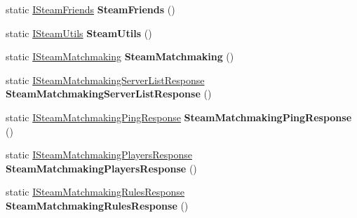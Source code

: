 \begin{DoxyCompactItemize}
\item 
\hypertarget{classValve_1_1Steamworks_1_1SteamAPI_a60561d4e0eeb5df7292e3ef841ff7df7}{}static \hyperlink{classValve_1_1Steamworks_1_1ISteamFriends}{I\+Steam\+Friends} {\bfseries Steam\+Friends} ()\label{classValve_1_1Steamworks_1_1SteamAPI_a60561d4e0eeb5df7292e3ef841ff7df7}

\item 
\hypertarget{classValve_1_1Steamworks_1_1SteamAPI_a92f204ee8c970c5f026b04f074943b4b}{}static \hyperlink{classValve_1_1Steamworks_1_1ISteamUtils}{I\+Steam\+Utils} {\bfseries Steam\+Utils} ()\label{classValve_1_1Steamworks_1_1SteamAPI_a92f204ee8c970c5f026b04f074943b4b}

\item 
\hypertarget{classValve_1_1Steamworks_1_1SteamAPI_a9ce4b71a247d6a4ed67331948f518b53}{}static \hyperlink{classValve_1_1Steamworks_1_1ISteamMatchmaking}{I\+Steam\+Matchmaking} {\bfseries Steam\+Matchmaking} ()\label{classValve_1_1Steamworks_1_1SteamAPI_a9ce4b71a247d6a4ed67331948f518b53}

\item 
\hypertarget{classValve_1_1Steamworks_1_1SteamAPI_a2442f7505c4ea8e32ced61bb82e41249}{}static \hyperlink{classValve_1_1Steamworks_1_1ISteamMatchmakingServerListResponse}{I\+Steam\+Matchmaking\+Server\+List\+Response} {\bfseries Steam\+Matchmaking\+Server\+List\+Response} ()\label{classValve_1_1Steamworks_1_1SteamAPI_a2442f7505c4ea8e32ced61bb82e41249}

\item 
\hypertarget{classValve_1_1Steamworks_1_1SteamAPI_a6b9749c088c07f6cbb23a0bf32f8210d}{}static \hyperlink{classValve_1_1Steamworks_1_1ISteamMatchmakingPingResponse}{I\+Steam\+Matchmaking\+Ping\+Response} {\bfseries Steam\+Matchmaking\+Ping\+Response} ()\label{classValve_1_1Steamworks_1_1SteamAPI_a6b9749c088c07f6cbb23a0bf32f8210d}

\item 
\hypertarget{classValve_1_1Steamworks_1_1SteamAPI_a1da1b26b94e3446d9cd3bb344eb004b0}{}static \hyperlink{classValve_1_1Steamworks_1_1ISteamMatchmakingPlayersResponse}{I\+Steam\+Matchmaking\+Players\+Response} {\bfseries Steam\+Matchmaking\+Players\+Response} ()\label{classValve_1_1Steamworks_1_1SteamAPI_a1da1b26b94e3446d9cd3bb344eb004b0}

\item 
\hypertarget{classValve_1_1Steamworks_1_1SteamAPI_a892f52c70e8185ecf36d546e54390471}{}static \hyperlink{classValve_1_1Steamworks_1_1ISteamMatchmakingRulesResponse}{I\+Steam\+Matchmaking\+Rules\+Response} {\bfseries Steam\+Matchmaking\+Rules\+Response} ()\label{classValve_1_1Steamworks_1_1SteamAPI_a892f52c70e8185ecf36d546e54390471}


\end{DoxyCompactItemize}
